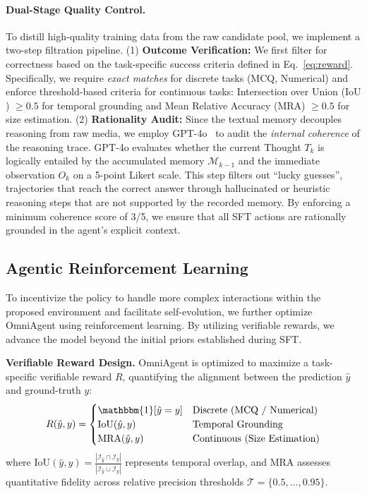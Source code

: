 \documentclass{article}
\theoremstyle{plain}
\theoremstyle{definition}
\theoremstyle{remark}
\begin{document}
\paragraph{Dual-Stage Quality Control.} 
To distill high-quality training data from the raw candidate pool, we implement a two-step filtration pipeline. 
(1) \textbf{Outcome Verification:} We first filter for correctness based on the task-specific success criteria defined in Eq.~\ref{eq:reward}. Specifically, we require \textit{exact matches} for discrete tasks (MCQ, Numerical) and enforce threshold-based criteria for continuous tasks: Intersection over Union ($\text{IoU}$) $\ge 0.5$ for temporal grounding and Mean Relative Accuracy ($\text{MRA}$) $\ge 0.5$ for size estimation.
(2) \textbf{Rationality Audit:} Since the textual memory decouples reasoning from raw media, we employ GPT-4o~\cite{gpt4o} to audit the \textit{internal coherence} of the reasoning trace. GPT-4o evaluates whether the current Thought $T_k$ is logically entailed by the accumulated memory $\mathcal{M}_{k-1}$ and the immediate observation $O_k$ on a 5-point Likert scale. This step filters out ``lucky guesses'', trajectories that reach the correct answer through hallucinated or heuristic reasoning steps that are not supported by the recorded memory. By enforcing a minimum coherence score of 3/5, we ensure that all SFT actions are rationally grounded in the agent's explicit context.

\subsection{Agentic Reinforcement Learning}
\label{subsec:rl}

To incentivize the policy to handle more complex interactions within the proposed environment and facilitate self-evolution, we further optimize OmniAgent using reinforcement learning. By utilizing verifiable rewards, we advance the model beyond the initial priors established during SFT.

\textbf{Verifiable Reward Design.}
OmniAgent is optimized to maximize a task-specific verifiable reward $R$, quantifying the alignment between the prediction $\hat{y}$ and ground-truth $y$:
\begin{equation} \label{eq:reward}
R(\hat{y}, y) = \begin{cases}  %
    \mathbbm{1}[\hat{y} = y] & \text{Discrete (MCQ / Numerical)} \\
    \text{IoU}(\hat{y}, y) & \text{Temporal Grounding} \\
    \text{MRA}(\hat{y}, y) & \text{Continuous (Size Estimation)}
\end{cases}
\end{equation}
where $\text{IoU}(\hat{y}, y) = \frac{|\mathcal{I}_{\hat{y}} \cap \mathcal{I}_y|}{|\mathcal{I}_{\hat{y}} \cup \mathcal{I}_y|}$ represents temporal overlap, and $\text{MRA}$ assesses quantitative fidelity across relative precision thresholds $\mathcal{T} = \{0.5, \dots, 0.95\}$.
\end{document}
